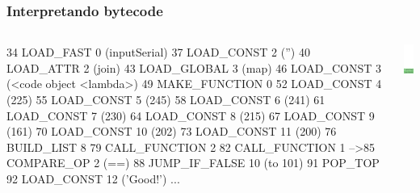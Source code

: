 \documentclass[9pt, notes=hide]{beamer}
\begin{document}
\begin{frame}[fragile]
    \frametitle{Interpretando bytecode}
        \begin{columns}[T]
            \begin{column}{.8\textwidth}
\begin{python}
   34  LOAD_FAST          0 (inputSerial)
   37  LOAD_CONST         2 ('')
   40  LOAD_ATTR          2 (join)
   43  LOAD_GLOBAL        3 (map)
   46  LOAD_CONST         3 (<code object <lambda>)
   49  MAKE_FUNCTION      0
   52  LOAD_CONST         4 (225)
   55  LOAD_CONST         5 (245)
   58  LOAD_CONST         6 (241)
   61  LOAD_CONST         7 (230)
   64  LOAD_CONST         8 (215)
   67  LOAD_CONST         9 (161)
   70  LOAD_CONST        10 (202)
   73  LOAD_CONST        11 (200)
   76  BUILD_LIST         8
   79  CALL_FUNCTION      2
   82  CALL_FUNCTION      1
-->85  COMPARE_OP         2 (==)
   88  JUMP_IF_FALSE     10 (to 101)
   91  POP_TOP
   92  LOAD_CONST        12 ('Good!')
   ...
\end{python}

            \end{column}
            \begin{column}{.3\textwidth}
                \includegraphics[width=2.5cm]{images/stack-7.png}
            \end{column}
        \end{columns}

\end{frame}
\end{document}
